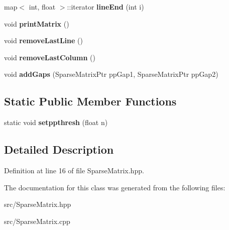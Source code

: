 \begin{DoxyCompactItemize}
\item 
\mbox{\label{classtops_1_1SparseMatrix_a66c2da1d9e2a3b1b87883ba90f8439a1}} 
map$<$ int, float $>$\+::iterator {\bfseries line\+End} (int i)
\item 
\mbox{\label{classtops_1_1SparseMatrix_a56e2225c4a4c0de81888d0004cd3cdfb}} 
void {\bfseries print\+Matrix} ()
\item 
\mbox{\label{classtops_1_1SparseMatrix_a369214fe38bd5f285bf95474425ca832}} 
void {\bfseries remove\+Last\+Line} ()
\item 
\mbox{\label{classtops_1_1SparseMatrix_a46170e2bc8e5a3d2c07f9ce9a711fd7e}} 
void {\bfseries remove\+Last\+Column} ()
\item 
\mbox{\label{classtops_1_1SparseMatrix_a3c2b100aaed7290ae603842d3e009bac}} 
void {\bfseries add\+Gaps} (Sparse\+Matrix\+Ptr pp\+Gap1, Sparse\+Matrix\+Ptr pp\+Gap2)
\end{DoxyCompactItemize}
\subsection*{Static Public Member Functions}
\begin{DoxyCompactItemize}
\item 
\mbox{\label{classtops_1_1SparseMatrix_a758203b466017aa095baac002927041f}} 
static void {\bfseries setppthresh} (float n)
\end{DoxyCompactItemize}


\subsection{Detailed Description}


Definition at line 16 of file Sparse\+Matrix.\+hpp.



The documentation for this class was generated from the following files\+:\begin{DoxyCompactItemize}
\item 
src/Sparse\+Matrix.\+hpp\item 
src/Sparse\+Matrix.\+cpp\end{DoxyCompactItemize}
